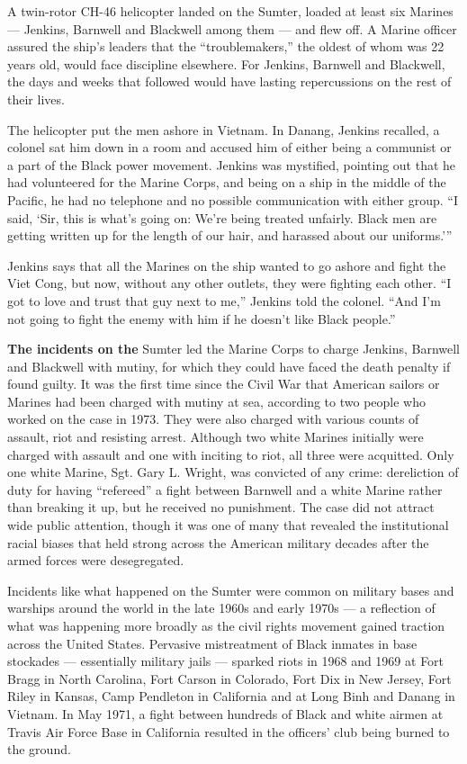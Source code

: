 A twin-rotor CH-46 helicopter landed on the Sumter, loaded at least six
Marines --- Jenkins, Barnwell and Blackwell among them --- and flew off.
A Marine officer assured the ship's leaders that the ``troublemakers,''
the oldest of whom was 22 years old, would face discipline elsewhere.
For Jenkins, Barnwell and Blackwell, the days and weeks that followed
would have lasting repercussions on the rest of their lives.

The helicopter put the men ashore in Vietnam. In Danang, Jenkins
recalled, a colonel sat him down in a room and accused him of either
being a communist or a part of the Black power movement. Jenkins was
mystified, pointing out that he had volunteered for the Marine Corps,
and being on a ship in the middle of the Pacific, he had no telephone
and no possible communication with either group. ``I said, `Sir, this is
what's going on: We're being treated unfairly. Black men are getting
written up for the length of our hair, and harassed about our
uniforms.'''

Jenkins says that all the Marines on the ship wanted to go ashore and
fight the Viet Cong, but now, without any other outlets, they were
fighting each other. ``I got to love and trust that guy next to me,''
Jenkins told the colonel. ``And I'm not going to fight the enemy with
him if he doesn't like Black people.''

\textbf{The incidents on the} Sumter led the Marine Corps to charge
Jenkins, Barnwell and Blackwell with mutiny, for which they could have
faced the death penalty if found guilty. It was the first time since the
Civil War that American sailors or Marines had been charged with mutiny
at sea, according to two people who worked on the case in 1973. They
were also charged with various counts of assault, riot and resisting
arrest. Although two white Marines initially were charged with assault
and one with inciting to riot, all three were acquitted. Only one white
Marine, Sgt. Gary L. Wright, was convicted of any crime: dereliction of
duty for having ``refereed'' a fight between Barnwell and a white Marine
rather than breaking it up, but he received no punishment. The case did
not attract wide public attention, though it was one of many that
revealed the institutional racial biases that held strong across the
American military decades after the armed forces were desegregated.

Incidents like what happened on the Sumter were common on military bases
and warships around the world in the late 1960s and early 1970s --- a
reflection of what was happening more broadly as the civil rights
movement gained traction across the United States. Pervasive
mistreatment of Black inmates in base stockades --- essentially military
jails --- sparked riots in 1968 and 1969 at Fort Bragg in North
Carolina, Fort Carson in Colorado, Fort Dix in New Jersey, Fort Riley in
Kansas, Camp Pendleton in California and at Long Binh and Danang in
Vietnam. In May 1971, a fight between hundreds of Black and white airmen
at Travis Air Force Base in California resulted in the officers' club
being burned to the ground.


